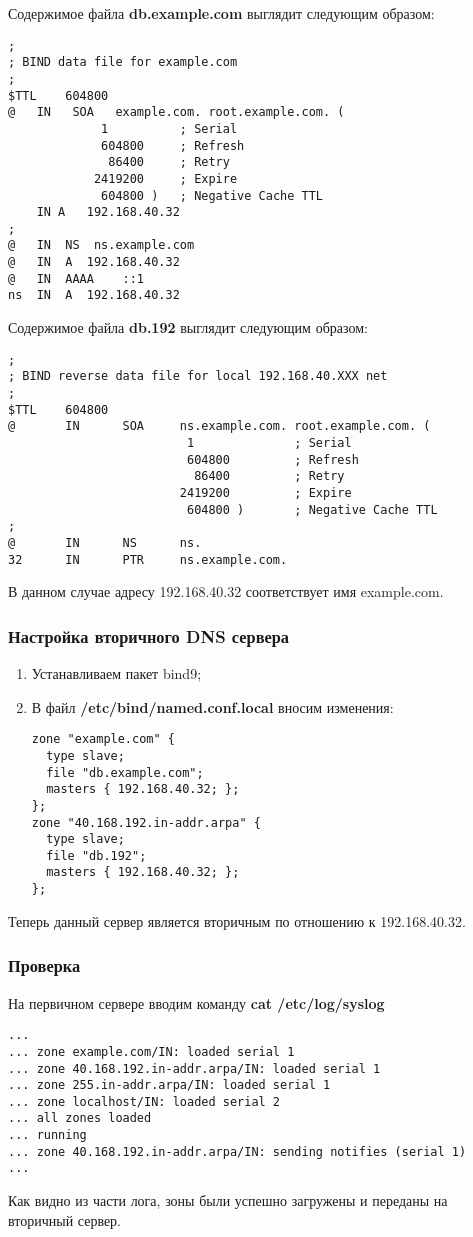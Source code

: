 \documentclass[14pt,a4paper,report]{report}
\begin{document}
Содержимое файла \textbf{db.example.com} выглядит следующим образом:
\begin{lstlisting}[language={}]
;
; BIND data file for example.com
;
$TTL    604800
@   IN   SOA   example.com. root.example.com. (
             1          ; Serial
             604800     ; Refresh
              86400     ; Retry
            2419200     ; Expire
             604800 )   ; Negative Cache TTL
    IN A   192.168.40.32
;
@   IN  NS  ns.example.com
@   IN  A  192.168.40.32
@   IN  AAAA    ::1
ns  IN  A  192.168.40.32
\end{lstlisting}

Содержимое файла \textbf{db.192} выглядит следующим образом:
\begin{lstlisting}[language={}]
;
; BIND reverse data file for local 192.168.40.XXX net
;
$TTL    604800
@       IN      SOA     ns.example.com. root.example.com. (
                         1              ; Serial
                         604800         ; Refresh
                          86400         ; Retry
                        2419200         ; Expire
                         604800 )       ; Negative Cache TTL
;
@       IN      NS      ns.
32      IN      PTR     ns.example.com.
\end{lstlisting}
В данном случае адресу 192.168.40.32 соответствует имя example.com. 

\subsubsection{Настройка вторичного DNS сервера}
\begin{enumerate}
\item Устанавливаем пакет bind9;
\item В файл \textbf{/etc/bind/named.conf.local} вносим изменения:
\begin{lstlisting}[language={}]
zone "example.com" {
  type slave;
  file "db.example.com";
  masters { 192.168.40.32; };
};        
zone "40.168.192.in-addr.arpa" {
  type slave;
  file "db.192";
  masters { 192.168.40.32; };
};
\end{lstlisting}
\end{enumerate}
Теперь данный сервер является вторичным по отношению к 192.168.40.32.

\subsubsection{Проверка}
На первичном сервере вводим команду \textbf{cat /etc/log/syslog}
\begin{lstlisting}[language={}]
...
... zone example.com/IN: loaded serial 1
... zone 40.168.192.in-addr.arpa/IN: loaded serial 1
... zone 255.in-addr.arpa/IN: loaded serial 1
... zone localhost/IN: loaded serial 2
... all zones loaded
... running
... zone 40.168.192.in-addr.arpa/IN: sending notifies (serial 1)
...
\end{lstlisting}
Как видно из части лога, зоны были успешно загружены и переданы на вторичный сервер.
\end{document}
